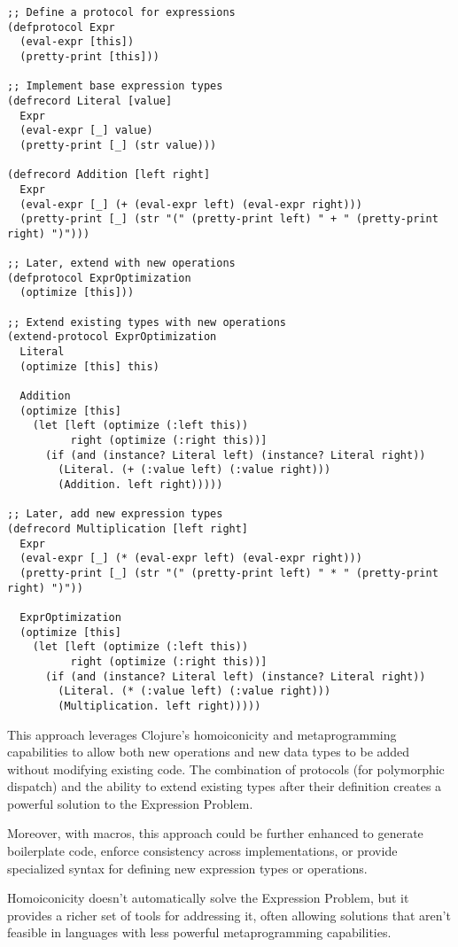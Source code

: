 \documentclass[11pt]{article}
\begin{document}
\begin{verbatim}
;; Define a protocol for expressions
(defprotocol Expr
  (eval-expr [this])
  (pretty-print [this]))

;; Implement base expression types
(defrecord Literal [value]
  Expr
  (eval-expr [_] value)
  (pretty-print [_] (str value)))

(defrecord Addition [left right]
  Expr
  (eval-expr [_] (+ (eval-expr left) (eval-expr right)))
  (pretty-print [_] (str "(" (pretty-print left) " + " (pretty-print right) ")")))

;; Later, extend with new operations
(defprotocol ExprOptimization
  (optimize [this]))

;; Extend existing types with new operations
(extend-protocol ExprOptimization
  Literal
  (optimize [this] this)

  Addition
  (optimize [this]
    (let [left (optimize (:left this))
          right (optimize (:right this))]
      (if (and (instance? Literal left) (instance? Literal right))
        (Literal. (+ (:value left) (:value right)))
        (Addition. left right)))))

;; Later, add new expression types
(defrecord Multiplication [left right]
  Expr
  (eval-expr [_] (* (eval-expr left) (eval-expr right)))
  (pretty-print [_] (str "(" (pretty-print left) " * " (pretty-print right) ")"))

  ExprOptimization
  (optimize [this]
    (let [left (optimize (:left this))
          right (optimize (:right this))]
      (if (and (instance? Literal left) (instance? Literal right))
        (Literal. (* (:value left) (:value right)))
        (Multiplication. left right)))))
\end{verbatim}

This approach leverages Clojure's homoiconicity and metaprogramming capabilities to allow both new operations and new data types to be added without modifying existing code. The combination of protocols (for polymorphic dispatch) and the ability to extend existing types after their definition creates a powerful solution to the Expression Problem.

Moreover, with macros, this approach could be further enhanced to generate boilerplate code, enforce consistency across implementations, or provide specialized syntax for defining new expression types or operations.

Homoiconicity doesn't automatically solve the Expression Problem, but it provides a richer set of tools for addressing it, often allowing solutions that aren't feasible in languages with less powerful metaprogramming capabilities.
\end{document}
